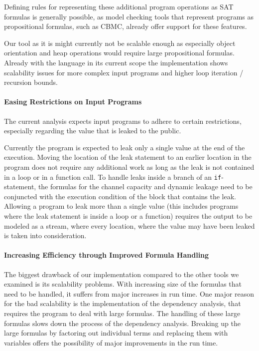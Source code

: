 Defining rules for representing these additional program operations as SAT formulas is generally possible, as model checking tools that represent programs as propositional formulas, such as CBMC, already offer support for these features.

Our tool as it is might currently not be scalable enough as especially object orientation and heap operations would require large propositional formulas. Already with the language in its current scope the implementation shows scalability issues for more complex input programs and higher loop iteration / recursion bounds.

\paragraph{Easing Restrictions on Input Programs}
The current analysis expects input programs to adhere to certain restrictions, especially regarding the value that is leaked to the public.

Currently the program is expected to leak only a single value at the end of the execution. Moving the location of the leak statement to an earlier location in the program does not require any additional work as long as the leak is not contained in a loop or in a function call. To handle leaks inside a branch of an \texttt{if}-statement, the formulas for the channel capacity and dynamic leakage need to be conjuncted with the execution condition of the block that contains the leak.
Allowing a program to leak more than a single value (this includes programs where the leak statement is inside a loop or a function) requires the output to be modeled as a stream, where every location, where the value may have been leaked is taken into consideration.

\paragraph{Increasing Efficiency through Improved Formula Handling}
The biggest drawback of our implementation compared to the other tools we examined is its scalability problems. With increasing size of the formulas that need to be handled, it suffers from major increases in run time. One major reason for the bad scalability is the implementation of the dependency analysis, that requires the program to deal with large formulas. The handling of these large formulas slows down the process of the dependency analysis. Breaking up the large formulas by factoring out individual terms and replacing them with variables offers the possibility of major improvements in the run time.

